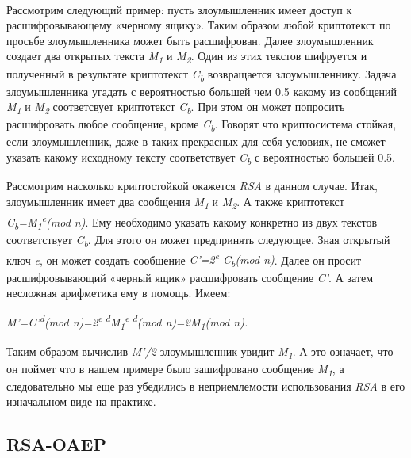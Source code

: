\paragraph{} Рассмотрим следующий пример: пусть злоумышленник имеет доступ к расшифровывающему «черному ящику». Таким образом любой криптотекст по просьбе злоумышленника может быть расшифрован. Далее злоумышленник создает два открытых текста \textit{M\textsubscript{1}} и \textit{M\textsubscript{2}}. Один из этих текстов шифруется и полученный в результате криптотекст \textit{C\textsubscript{b}} возвращается злоумышленнику. Задача злоумышленника угадать с вероятностью большей чем 0.5 какому из сообщений \textit{M\textsubscript{1}} и \textit{M\textsubscript{2}} соответсвует криптотекст \textit{C\textsubscript{b}}. При этом он может попросить расшифровать любое сообщение, кроме \textit{C\textsubscript{b}}. Говорят что криптосистема стойкая, если злоумышленник, даже в таких прекрасных для себя условиях, не сможет указать какому исходному тексту соответствует \textit{C\textsubscript{b}}  с вероятностью большей 0.5.

Рассмотрим насколько криптостойкой окажется \textit{RSA} в данном случае. Итак, злоумышленник имеет два сообщения \textit{M\textsubscript{1}} и \textit{M\textsubscript{2}}. А также криптотекст \textit{C\textsubscript{b}=M\textsubscript{1}\textsuperscript{e}(mod n)}. Ему необходимо указать какому конкретно из двух текстов соответствует \textit{C\textsubscript{b}}. Для этого он может предпринять следующее. Зная открытый ключ \textit{e}, он может создать сообщение \textit{C'=2\textsuperscript{e} C\textsubscript{b}(mod n)}. Далее он просит расшифровывающий «черный ящик» расшифровать сообщение \textit{C'}. А затем несложная арифметика ему в помощь. Имеем:

\begin{center}
	\textit{M'=C'\textsuperscript{d}(mod n)=2\textsuperscript{e d}M\textsubscript{1}\textsuperscript{e d}(mod n)=2M\textsubscript{1}(mod n).} 
\end{center}

Таким образом вычислив \textit{M'/2} злоумышленник увидит \textit{M\textsubscript{1}}. А это означает, что он поймет что в нашем примере было зашифровано сообщение \textit{M\textsubscript{1}}, а следовательно мы еще раз убедились в неприемлемости использования \textit{RSA} в его изначальном виде на практике.

\subsection{RSA-OAEP}

